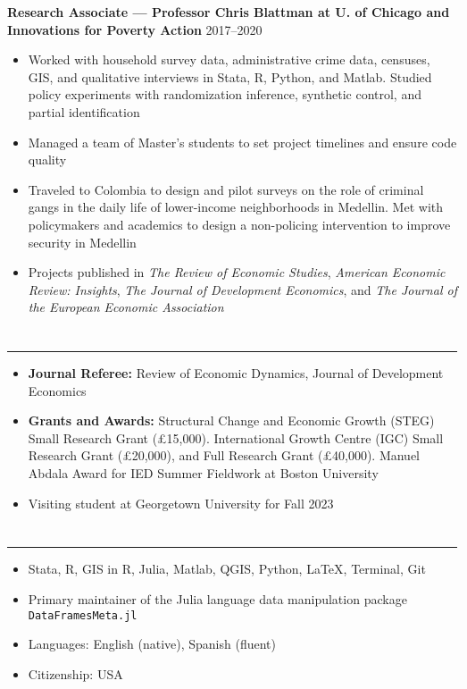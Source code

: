 \documentclass[10pt]{article}
\newenvironment{customitemize}
{ \begin{itemize}[leftmargin=\parindent, topsep = 0.2pt, itemsep = -3pt] }
{\end{itemize} }
\begin{document}
\noindent \textbf{Research Associate --- Professor Chris Blattman at U. of Chicago and Innovations for Poverty Action}  \hfill 2017--2020 
\begin{customitemize}
	\item Worked with household survey data, administrative crime data, censuses, GIS, and qualitative interviews in Stata, R, Python, and Matlab. Studied policy experiments with randomization inference, synthetic control, and partial identification
	\item Managed a team of Master's students to set project timelines and ensure code quality 
	\item Traveled to Colombia to design and pilot surveys on the role of criminal gangs in the daily life of lower-income neighborhoods in Medellin. Met with policymakers and academics to design a non-policing intervention to improve security in Medellin
	\item Projects published in \textit{The Review of Economic Studies}, \textit{American Economic Review: Insights}, \textit{The Journal of Development Economics}, and \textit{The Journal of the European Economic Association}
\end{customitemize}

\section*{} 
\noindent \rule{\textwidth}{1pt} 
\begin{customitemize}
	\item \textbf{Journal Referee:} Review of Economic Dynamics, Journal of Development Economics
	\item \textbf{Grants and Awards:} Structural Change and Economic Growth (STEG) Small Research Grant (\pounds15,000). International Growth Centre (IGC) Small Research Grant (\pounds20,000), and Full Research Grant (\pounds40,000). Manuel Abdala Award for IED Summer Fieldwork at Boston University
	\item Visiting student at Georgetown University for Fall 2023
\end{customitemize}
\section*{}
\noindent \rule{\textwidth}{1pt} 
\begin{customitemize}
	\item Stata, R, GIS in R, Julia, Matlab, QGIS, Python, LaTeX, Terminal, Git
	\item Primary maintainer of the Julia language data manipulation package \texttt{DataFramesMeta.jl} 
	\item Languages: English (native), Spanish (fluent)
	\item Citizenship: USA
\end{customitemize}

\end{document}
